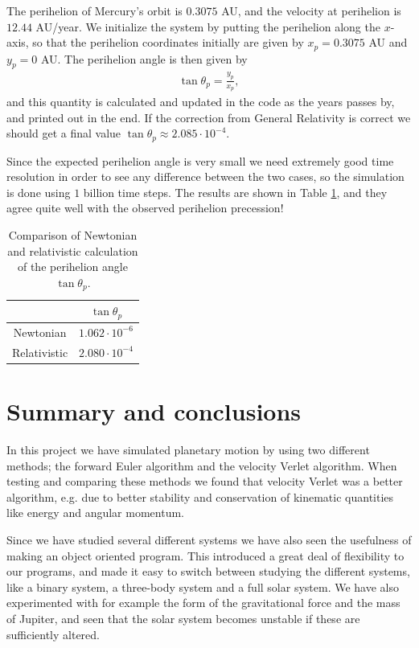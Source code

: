 \documentclass[12pt, a4paper]{article}
\begin{document}
The perihelion of Mercury's orbit is $0.3075$ AU, and the velocity at perihelion is $12.44$ AU/year. 
We initialize the system by putting the perihelion along the $x$-axis, so that the perihelion 
coordinates initially are given by $x_p=0.3075$ AU and $y_p=0$ AU. The perihelion angle is then given by 
\begin{align*}
\tan\theta_p = \frac{y_p}{x_p},  
\end{align*}
and this quantity is calculated and updated in the code as the years passes by, and printed out in the 
end. If the correction from General Relativity is correct we should get a final value 
$\tan\theta_p \approx 2.085\cdot 10^{-4}$. 

Since the expected perihelion angle is very small we need extremely good time resolution in order to 
see any difference between the two cases, so the simulation is done using $1$ billion time steps. 
The results are shown in Table \ref{tab:perihelion}, and they agree quite well with the observed 
perihelion precession! 

\begin{table}[ht!]
\caption{Comparison of Newtonian and relativistic calculation of the perihelion angle $\tan\theta_p$.}
\label{tab:perihelion}
\begin{center}
\begin{tabular}{cc} \\ \hline\hline 
& $\tan\theta_p$ \\ \hline
Newtonian & $1.062\cdot 10^{-6}$ \\
Relativistic & $2.080\cdot 10^{-4}$ \\ \hline\hline
\end{tabular}
\end{center}
\end{table}


\section{Summary and conclusions}

In this project we have simulated planetary motion by using two different methods; the forward Euler 
algorithm and the velocity Verlet algorithm. When testing and comparing these methods we found that 
velocity Verlet was a better algorithm, e.g. due to better stability and conservation of kinematic 
quantities like energy and angular momentum. 

Since we have studied several different systems we have also seen the usefulness of making an object 
oriented program. This introduced a great deal of flexibility to our programs, and made it easy to switch 
between studying the different systems, like a binary system, a three-body system and a full solar system. 
We have also experimented with for example the form of the gravitational force and the mass of Jupiter, 
and seen that the solar system becomes unstable if these are sufficiently altered. 
\end{document}
